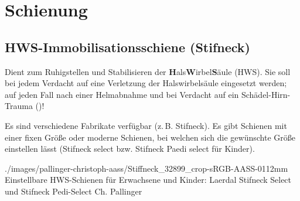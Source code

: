\needspace{0.5\textheight}
\section{Schienung}
\label{topic:schienung}\label{topic:schienungsmaterial}

\subsection{HWS-Immobilisationsschiene (Stifneck\texttrademark)}
\label{topic:hws-schiene-anlegen}
\label{topic:hws-schiene-beschreibung}



{%
Dient zum Ruhigstellen und Stabilisieren der {\bfseries
H}als{\bfseries W}irbel{\bfseries S}äule (HWS). Sie soll bei
jedem Verdacht auf eine Verletzung der Halswirbelsäule
eingesetzt werden; auf jeden Fall nach einer Helmabnahme und
bei Verdacht auf ein Schädel-Hirn-Trauma
()!

Es sind verschiedene
Fabrikate verfügbar (z.\,B. Stifneck\texttrademark). Es gibt
Schienen mit einer fixen Größe oder moderne Schienen, bei
welchen sich die gewünschte Größe einstellen lässt
(Stifneck select{\texttrademark} bzw. Stifneck Paedi
select{\texttrademark} für Kinder).

}{

}
{}
{}
{}

{}%
{}%
{./images/pallinger-christoph-aass/Stiffneck_32899_crop-sRGB-AASS-0112mm}%
{Einstellbare HWS-Schienen für Erwachsene und Kinder:
Laerdal{\texttrademark} Stifneck Select{\texttrademark} und
Stifneck Pedi-Select{\texttrademark}}%
{Ch. Pallinger}%

